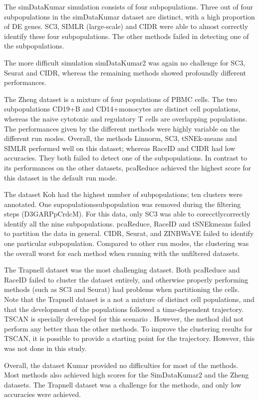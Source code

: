\documentclass[12pt, a4paper]{article}\usepackage[]{graphicx}\usepackage[]{color}
\begin{document}
The simDataKumar simulation consists of four subpopulations. Three out of four subpopulations in the simDataKumar dataset are distinct, with a high proportion of DE genes. SC3, SIMLR (large-scale) and CIDR were able to almost correctly identify these four subpopulations. The other methods failed in detecting one of the subpopulations.  

The more difficult simulation simDataKumar2 was again no challenge for SC3, Seurat and CIDR, whereas the remaining methods showed profoundly different performances. 

The Zheng dataset is a mixture of four populations of PBMC cells. The two subpopulations CD19+B and CD14+monocytes are distinct cell populations, whereas the naive cytotoxic and regulatory T cells are overlapping populations. The performances given by the different methods were highly variable on the different run modes. Overall, the methods Linnorm, SC3, tSNEk-means and SIMLR performed well on this dataset; whereas RaceID and CIDR had low accuracies. They both failed to detect one of the subpopulations. In contrast to its performances on the other datasets, pcaReduce achieved the highest score for this dataset in the default run mode.

The dataset Koh had the highest number of subpopulations;  ten clusters were annotated. One supopulationssubpopulation was removed during the filtering steps (D3GARPpCrdcM). For this data, only SC3 was able to corecctlycorrectly identify all the nine subpopulations. pcaReduce, RaceID and tSNEkmeans failed to partition the data in general. CIDR, Seurat, and ZINBWaVE failed to identify one particular subpopulation. Compared to other run modes, the clustering was the overall worst for each method when running with the unfiltered datasets. 

The Trapnell dataset was the most challenging dataset. Both pcaReduce and RaceID failed to cluster the dataset entirely, and otherwise properly performing methods (such as SC3 and Seurat) had problems when partitioning the cells. Note that the Trapnell dataset is a not a mixture of distinct cell populations, and that the development of the populations followed a time-dependent trajectory. TSCAN is specially developed for this scenario \citep{ji2015tscan}. However, the method did not perform any better than the other methods. To improve the clustering results for TSCAN, it is possible to provide a starting point for the trajectory. However, this was not done in this study. 

Overall, the dataset Kumar provided no difficulties for most of the methods. Most methods also achieved high scores for the SimDataKumar2 and the Zheng datasets. The Trapnell dataset was a challenge for the methods, and only low accuracies were achieved.
\end{document}
